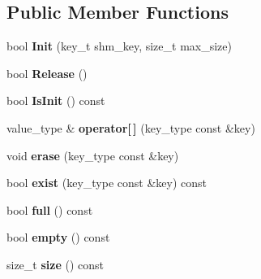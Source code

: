 \subsection*{Public Member Functions}
\begin{DoxyCompactItemize}
\item 
\hypertarget{classBasicManager_a14b632eff3b53fc1e6fc16e2ec9270fa}{
bool {\bfseries Init} (key\_\-t shm\_\-key, size\_\-t max\_\-size)}
\label{classBasicManager_a14b632eff3b53fc1e6fc16e2ec9270fa}

\item 
\hypertarget{classBasicManager_a8c55eb4cd8ff7455e5e6b29f99af2237}{
bool {\bfseries Release} ()}
\label{classBasicManager_a8c55eb4cd8ff7455e5e6b29f99af2237}

\item 
\hypertarget{classBasicManager_a8d0552a7f312472149c4a67a27243169}{
bool {\bfseries IsInit} () const }
\label{classBasicManager_a8d0552a7f312472149c4a67a27243169}

\item 
\hypertarget{classBasicManager_a6c98f87a4533b018395ba096abc4340f}{
value\_\-type \& {\bfseries operator\mbox{[}$\,$\mbox{]}} (key\_\-type const \&key)}
\label{classBasicManager_a6c98f87a4533b018395ba096abc4340f}

\item 
\hypertarget{classBasicManager_a9eb5c73dbffc2a92e744f3c41a3a9ff3}{
void {\bfseries erase} (key\_\-type const \&key)}
\label{classBasicManager_a9eb5c73dbffc2a92e744f3c41a3a9ff3}

\item 
\hypertarget{classBasicManager_a61cd6c55ad4475d4152069795f7b0320}{
bool {\bfseries exist} (key\_\-type const \&key) const }
\label{classBasicManager_a61cd6c55ad4475d4152069795f7b0320}

\item 
\hypertarget{classBasicManager_a3d702997950a395a6f672cd663b1479a}{
bool {\bfseries full} () const }
\label{classBasicManager_a3d702997950a395a6f672cd663b1479a}

\item 
\hypertarget{classBasicManager_a7e33089bf1fa64c9f70ab00b1366a971}{
bool {\bfseries empty} () const }
\label{classBasicManager_a7e33089bf1fa64c9f70ab00b1366a971}

\item 
\hypertarget{classBasicManager_a7de6209642db38a4f6fa517ef5b8cfdf}{
size\_\-t {\bfseries size} () const }
\label{classBasicManager_a7de6209642db38a4f6fa517ef5b8cfdf}


\end{DoxyCompactItemize}
